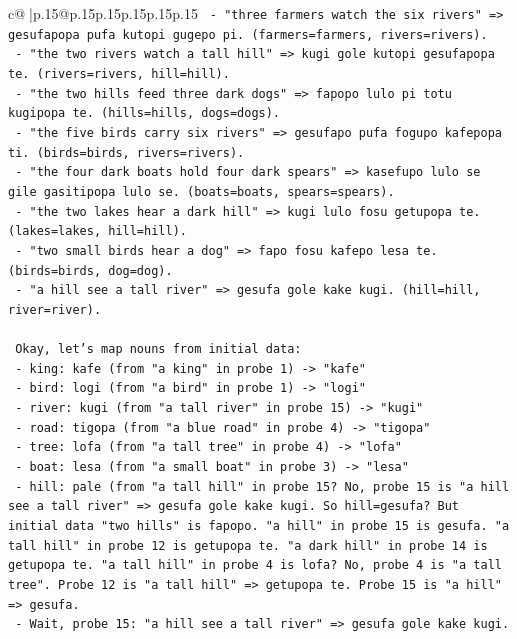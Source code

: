 \documentclass{article}
\begin{document}
{\begin{supertabular}{c@{$\;$}|p{.15\linewidth}@{}p{.15\linewidth}p{.15\linewidth}p{.15\linewidth}p{.15\linewidth}p{.15\linewidth}}
{{{\texttt{    {-} "three farmers watch the six rivers" => gesufapopa pufa kutopi gugepo pi. (farmers=farmers, rivers=rivers).} \\
\texttt{    {-} "the two rivers watch a tall hill" => kugi gole kutopi gesufapopa te. (rivers=rivers, hill=hill).} \\
\texttt{    {-} "the two hills feed three dark dogs" => fapopo lulo pi totu kugipopa te. (hills=hills, dogs=dogs).} \\
\texttt{    {-} "the five birds carry six rivers" => gesufapo pufa fogupo kafepopa ti. (birds=birds, rivers=rivers).} \\
\texttt{    {-} "the four dark boats hold four dark spears" => kasefupo lulo se gile gasitipopa lulo se. (boats=boats, spears=spears).} \\
\texttt{    {-} "the two lakes hear a dark hill" => kugi lulo fosu getupopa te. (lakes=lakes, hill=hill).} \\
\texttt{    {-} "two small birds hear a dog" => fapo fosu kafepo lesa te. (birds=birds, dog=dog).} \\
\texttt{    {-} "a hill see a tall river" => gesufa gole kake kugi. (hill=hill, river=river).} \\
\\ 
\texttt{  Okay, let's map nouns from initial data:} \\
\texttt{  {-} king: kafe (from "a king" in probe 1) {-}> "kafe"} \\
\texttt{  {-} bird: logi (from "a bird" in probe 1) {-}> "logi"} \\
\texttt{  {-} river: kugi (from "a tall river" in probe 15) {-}> "kugi"} \\
\texttt{  {-} road: tigopa (from "a blue road" in probe 4) {-}> "tigopa"} \\
\texttt{  {-} tree: lofa (from "a tall tree" in probe 4) {-}> "lofa"} \\
\texttt{  {-} boat: lesa (from "a small boat" in probe 3) {-}> "lesa"} \\
\texttt{  {-} hill: pale (from "a tall hill" in probe 15? No, probe 15 is "a hill see a tall river" => gesufa gole kake kugi. So hill=gesufa? But initial data "two hills" is fapopo. "a hill" in probe 15 is gesufa. "a tall hill" in probe 12 is getupopa te. "a dark hill" in probe 14 is getupopa te. "a tall hill" in probe 4 is lofa? No, probe 4 is "a tall tree". Probe 12 is "a tall hill" => getupopa te. Probe 15 is "a hill" => gesufa.} \\
\texttt{  {-} Wait, probe 15: "a hill see a tall river" => gesufa gole kake kugi.} \\
}}}
\end{supertabular}}
\end{document}
